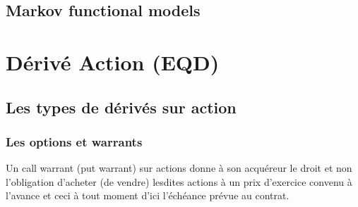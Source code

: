 \documentclass[a4paper]{article}
\begin{document}
\subsection{Markov functional models}

\section{Dérivé Action (EQD)}

\subsection{Les types de dérivés sur action}

\subsubsection{Les options et warrants}

Un call warrant (put warrant) sur actions donne à son acquéreur le droit et non l’obligation d’acheter (de vendre) lesdites actions à un prix d’exercice convenu à l’avance et ceci à tout moment d’ici l’échéance prévue au contrat.
\end{document}
